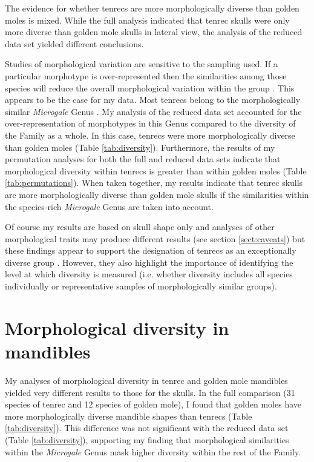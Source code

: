 	

	The evidence for whether tenrecs are more morphologically diverse than golden moles is mixed. While the full analysis indicated that tenrec skulls were only more diverse than golden mole skulls in lateral view, the analysis of the reduced data set yielded different conclusions.
	
	Studies of morphological variation are sensitive to the sampling used. If a particular morphotype is over-represented then the similarities among those species will reduce the overall morphological variation within the group \citep{Foote1991}. This appears to be the case for my data. Most tenrecs belong to the morphologically similar \textit{Microgale} Genus \citep{Jenkins2003}. My analysis of the reduced data set accounted for the over-representation of morphotypes in this Genus compared to the diversity of the Family as a whole. In this case, tenrecs were more morphologically diverse than golden moles (Table \ref{tab:diversity}). Furthermore, the results of my permutation analyses for both the full and reduced data sets indicate that morphological diversity within tenrecs is greater than within golden moles (Table \ref{tab:permutations}).
	When taken together, my results indicate that tenrec skulls are more morphologically diverse than golden mole skulls if the similarities within the species-rich \textit{Microgale} Genus are taken into account. 
	
	Of course my results are based on skull shape only and analyses of other morphological traits may produce different results (see section \ref{sect:caveats}) but
	these findings appear to support the designation of tenrecs as an exceptionally diverse group \citep{Olson2013, Eisenberg1969}. However, they also highlight the importance of identifying the level at which diversity is measured (i.e. whether diversity includes all species individually or representative samples of morphologically similar groups). 
	
	

\section{Morphological diversity in mandibles}
	My analyses of morphological diversity in tenrec and golden mole mandibles yielded very different results to those for the skulls. In the full comparison (31 species of tenrec and 12 species of golden mole), I found that golden moles have more morphologically diverse mandible shapes than tenrecs (Table \ref{tab:diversity}). This difference was not significant with the reduced data set (Table \ref{tab:diversity}), supporting my finding that morphological similarities within the \textit{Microgale} Genus mask higher diversity within the rest of the Family.
	
